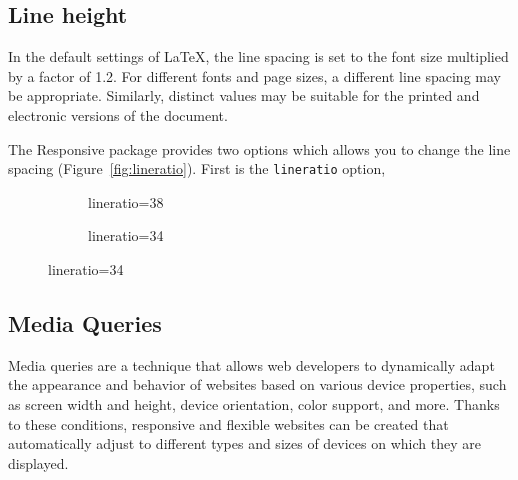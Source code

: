 \documentclass{ltxdoc}
\newcommand\printsize[1]{\csname #1\endcsname\par\noindent Sample\par}
\newcommand\showscale[2][.5\textwidth]{%
  \noindent\fbox{%
    \begin{minipage}{#1}
      \ResponsiveSetup{#2}
      \setsizes[34]{25}
      \printsize{huge}
      \printsize{LARGE}
      \printsize{Large}
      \printsize{large}
      \hrule
      \printsize{normalsize}
      \hrule
      \printsize{small}
      \printsize{footnotesize}
    \end{minipage}
  }
    \ifx\relax#2\relax Default parameters\else\texttt{#2}\fi\hfill\null
}
\begin{document}

\subsection{Line height}

In the default settings of \LaTeX, the line spacing is set to the font size
multiplied by a factor of 1.2. For different fonts and page sizes, a different
line spacing may be appropriate. Similarly, distinct values may be suitable for
the printed and electronic versions of the document. 

The Responsive package provides two options which allows you to change the line spacing
(Figure~\ref{fig:lineratio}). First is the  \verb|lineratio| option, 

\begin{figure}[htbp]
  \caption{Changing the line spacing by adjusting the value of \texttt{lineratio}.}\label{fig:lineratio}
  \begin{subfigure}[b]{0.45\textwidth}
\caption{lineratio=38}
\end{subfigure}
\begin{subfigure}[b]{0.45\textwidth}
\caption{lineratio=34}
\end{subfigure}
\end{figure}


\subsection{Media Queries}

Media queries are a technique that allows web developers to dynamically adapt
the appearance and behavior of websites based on various device properties,
such as screen width and height, device orientation, color support, and more.
Thanks to these conditions, responsive and flexible websites can be created
that automatically adjust to different types and sizes of devices on which they
are displayed.
\end{document}
